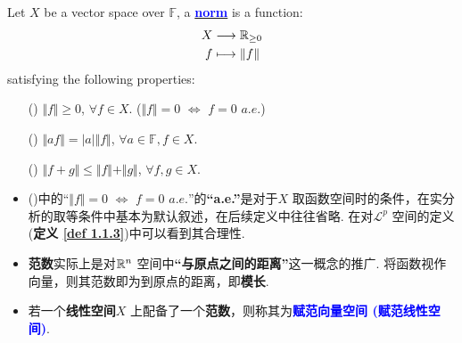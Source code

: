 	\begin{defn}\label{def 1.1.1}
		Let $X$ be a vector space over $\mathbb{F}$, a \underline{\textcolor{blue}{\textbf{norm}}} is a function:
		\begin{align}
			X &\longrightarrow \mathbb{R}_{\geq 0} \\
			f &\longmapsto \Vert f \Vert
		\end{align}
		satisfying the following properties:
		\begin{enumerate}
			\item[(\rmnum{1})]$\Vert f \Vert \geq 0$, $\forall f \in X$. \hspace*{3em} ($\Vert f \Vert = 0 \,\, \Leftrightarrow \,\, f = 0 \,\, a.e.$)
			
			\item[(\rmnum{2})]$\Vert af \Vert = \left| a \right| \Vert f \Vert$, $\forall a \in \mathbb{F}, f \in X$.
			
			\item[(\rmnum{3})]$\Vert f + g \Vert \leq \Vert f \Vert + \Vert g \Vert$, $\forall f , g \in X$.
		\end{enumerate}
		
		\vspace{2em}
		\begin{rmk}
			\begin{itemize}
				\item ()中的“$\Vert f \Vert = 0 \,\, \Leftrightarrow \,\, f = 0 \,\, a.e.$”的\textbf{“a.e.”}是对于$X$ 取函数空间时的条件，在实分析的取等条件中基本为默认叙述，在后续定义中往往省略. 在对$\mathcal{L}^p$ 空间的定义 (\textbf{定义 \ref{def 1.1.3}})中可以看到其合理性.
				
				\vspace{1em}
				
				\item \textbf{范数}实际上是对$\mathbb{R}^n$ 空间中\textbf{“与原点之间的距离”}这一概念的推广. 将函数视作向量，则其范数即为到原点的距离，即\textbf{模长}.
				
				\vspace{1em}
				
				\item 若一个\textbf{线性空间}$X$ 上配备了一个\textbf{范数}，则称其为\textcolor{blue}{\textbf{赋范向量空间 (赋范线性空间)}}.
			\end{itemize}
		\end{rmk}
	\end{defn}
	

